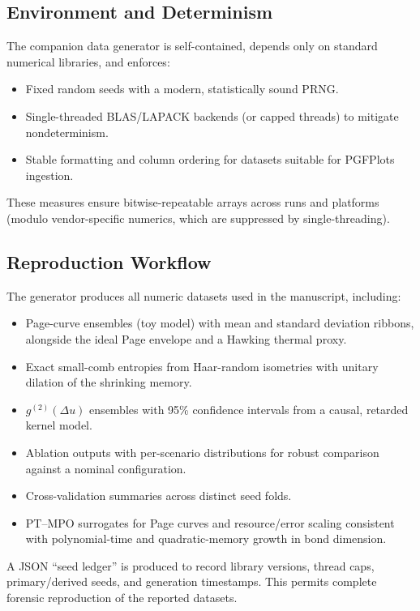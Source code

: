 \documentclass[aps,prd,preprint,onecolumn,superscriptaddress,nofootinbib,longbibliography,floatfix,11pt,showpacs,showkeys]{revtex4-2}
\theoremstyle{plain}
\theoremstyle{definition}
\theoremstyle{remark}
\begin{document}
\subsection{Environment and Determinism}
The companion data generator is self-contained, depends only on standard numerical libraries, and enforces:
\begin{itemize}
  \item Fixed random seeds with a modern, statistically sound PRNG.
  \item Single-threaded BLAS/LAPACK backends (or capped threads) to mitigate nondeterminism.
  \item Stable formatting and column ordering for datasets suitable for PGFPlots ingestion.
\end{itemize}
These measures ensure bitwise-repeatable arrays across runs and platforms (modulo vendor-specific numerics, which are suppressed by single-threading).

\subsection{Reproduction Workflow}
The generator produces all numeric datasets used in the manuscript, including:
\begin{itemize}
  \item Page-curve ensembles (toy model) with mean and standard deviation ribbons, alongside the ideal Page envelope and a Hawking thermal proxy.
  \item Exact small-comb entropies from Haar-random isometries with unitary dilation of the shrinking memory.
  \item $g^{(2)}(\Delta u)$ ensembles with 95\% confidence intervals from a causal, retarded kernel model.
  \item Ablation outputs with per-scenario distributions for robust comparison against a nominal configuration.
  \item Cross-validation summaries across distinct seed folds.
  \item PT--MPO surrogates for Page curves and resource/error scaling consistent with polynomial-time and quadratic-memory growth in bond dimension.
\end{itemize}
A JSON ``seed ledger'' is produced to record library versions, thread caps, primary/derived seeds, and generation timestamps. This permits complete forensic reproduction of the reported datasets.
\end{document}
